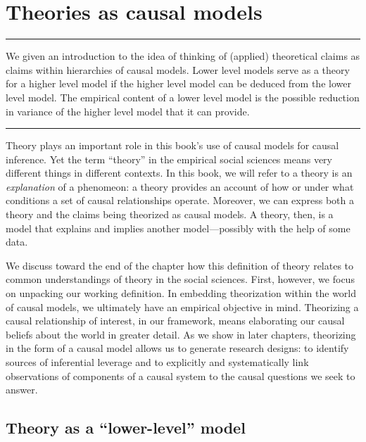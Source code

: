 \documentclass[
  12pt,
]{book}
\begin{document}
\hypertarget{theory}{%
\chapter{Theories as causal models}\label{theory}}

\begin{center}\rule{0.5\linewidth}{0.5pt}\end{center}

We given an introduction to the idea of thinking of (applied) theoretical claims as claims within hierarchies of causal models. Lower level models serve as a theory for a higher level model if the higher level model can be deduced from the lower level model. The empirical content of a lower level model is the possible reduction in variance of the higher level model that it can provide.

\begin{center}\rule{0.5\linewidth}{0.5pt}\end{center}

Theory plays an important role in this book's use of causal models for causal inference. Yet the term ``theory'' in the empirical social sciences means very different things in different contexts. In this book, we will refer to a theory is an \emph{explanation} of a phenomeon: a theory provides an account of how or under what conditions a set of causal relationships operate. Moreover, we can express both a theory and the claims being theorized as causal models. A theory, then, is a model that explains and implies another model---possibly with the help of some data.

We discuss toward the end of the chapter how this definition of theory relates to common understandings of theory in the social sciences. First, however, we focus on unpacking our working definition. In embedding theorization within the world of causal models, we ultimately have an empirical objective in mind. Theorizing a causal relationship of interest, in our framework, means elaborating our causal beliefs about the world in greater detail. As we show in later chapters, theorizing in the form of a causal model allows us to generate research designs: to identify sources of inferential leverage and to explicitly and systematically link observations of components of a causal system to the causal questions we seek to answer.

\hypertarget{theory-as-a-lower-level-model}{%
\section{Theory as a ``lower-level'' model}\label{theory-as-a-lower-level-model}}
\end{document}
